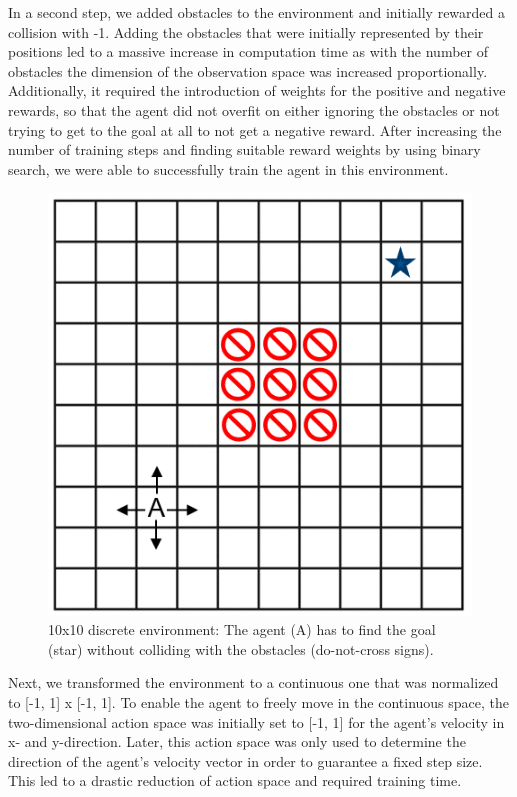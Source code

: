 \documentclass[conference]{IEEEtran}
\begin{document}
In a second step, we added obstacles to the environment and initially rewarded a collision with -1. Adding the obstacles that were initially represented by their positions led to a massive increase in computation time as with the number of obstacles the dimension of the observation space was increased proportionally. Additionally, it required the introduction of weights for the positive and negative rewards, so that the agent did not overfit on either ignoring the obstacles or not trying to get to the goal at all to not get a negative reward. After increasing the number of training steps and finding suitable reward weights by using binary search, we were able to successfully train the agent in this environment.

\begin{figure}[htbp]
	\centerline{\includegraphics{discrete.png}}
	\caption{10x10 discrete environment: The agent (A) has to find the goal (star) without colliding with the obstacles (do-not-cross signs).}
	\label{fig3}
\end{figure}

Next, we transformed the environment to a continuous one that was normalized to [-1, 1] x [-1, 1]. To enable the agent to freely move in the continuous space, the two-dimensional action space was initially set to [-1, 1] for the agent's velocity in x- and y-direction. Later, this action space was only used to determine the direction of the agent's velocity vector in order to guarantee a fixed step size. This led to a drastic reduction of action space and required training time. 
\end{document}
